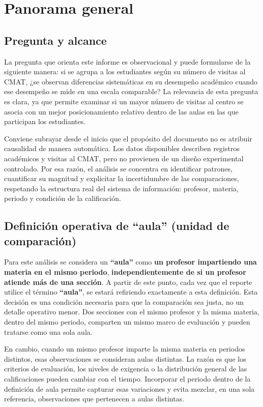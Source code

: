 \documentclass[10pt,letterpaper]{article} %
\numberwithin{figure}{subsection}
\let\oldsection\section
\renewcommand{\section}{\clearpage\oldsection}
\begin{document}

\newpage
\tableofcontents
\thispagestyle{empty}
\newpage
{}

\section{Panorama general}

\subsection{Pregunta y alcance}
La pregunta que orienta este informe es observacional y puede formularse de la siguiente manera: si se agrupa a los estudiantes según su número de visitas al CMAT, ¿se observan diferencias sistemáticas en su desempeño académico cuando ese desempeño se mide en una escala comparable? La relevancia de esta pregunta es clara, ya que permite examinar si un mayor número de visitas al centro se asocia con un mejor posicionamiento relativo dentro de las aulas en las que participan los estudiantes.

Conviene subrayar desde el inicio que el propósito del documento no es atribuir causalidad de manera automática. Los datos disponibles describen registros académicos y visitas al CMAT, pero no provienen de un diseño experimental controlado. Por esa razón, el análisis se concentra en identificar patrones, cuantificar su magnitud y explicitar la incertidumbre de las comparaciones, respetando la estructura real del sistema de información: profesor, materia, periodo y condición de la calificación.

\subsection{Definición operativa de ``aula'' (unidad de comparación)}
Para este análisis se considera un \textbf{``aula''} como \textbf{un profesor impartiendo una materia en el mismo periodo}, \textbf{independientemente de si un profesor atiende más de una sección}. A partir de este punto, cada vez que el reporte utilice el término \textbf{``aula''}, se estará refiriendo exactamente a esta definición. Esta decisión es una condición necesaria para que la comparación sea justa, no un detalle operativo menor. Dos secciones con el mismo profesor y la misma materia, dentro del mismo periodo, comparten un mismo marco de evaluación y pueden tratarse como una sola aula.

En cambio, cuando un mismo profesor imparte la misma materia en periodos distintos, esas observaciones se consideran aulas distintas. La razón es que los criterios de evaluación, los niveles de exigencia o la distribución general de las calificaciones pueden cambiar con el tiempo. Incorporar el periodo dentro de la definición de aula permite capturar esas variaciones y evita mezclar, en una sola referencia, observaciones que pertenecen a aulas distintas.
\end{document}
